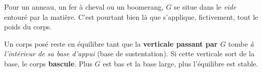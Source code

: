 \documentclass[11pt,a4paper]{article}
\begin{document}
\begin{piege}
Pour un anneau, un fer à cheval ou un boomerang, $G$ se situe dans le \emph{vide} entouré par la
matière. C'est pourtant bien là que s'applique, fictivement, tout le poids du corps.
\end{piege}

\begin{cle}
Un corps posé reste en équilibre tant que la \textbf{verticale passant par $G$} tombe \emph{à
l'intérieur de sa base d'appui} (base de sustentation). Si cette verticale sort de la base, le corps
\textbf{bascule}. Plus $G$ est bas et la base large, plus l'équilibre est stable.
\end{cle}
\end{document}
